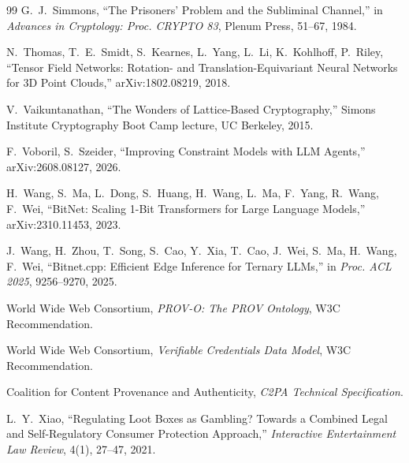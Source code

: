 \begin{thebibliography}{99}
G.~J.~Simmons, ``The Prisoners' Problem and the Subliminal Channel,'' in \textit{Advances in Cryptology: Proc. CRYPTO 83}, Plenum Press, 51--67, 1984.

N.~Thomas, T.~E.~Smidt, S.~Kearnes, L.~Yang, L.~Li, K.~Kohlhoff, P.~Riley, ``Tensor Field Networks: Rotation- and Translation-Equivariant Neural Networks for 3D Point Clouds,'' arXiv:1802.08219, 2018.

V.~Vaikuntanathan, ``The Wonders of Lattice-Based Cryptography,'' Simons Institute Cryptography Boot Camp lecture, UC Berkeley, 2015.

F.~Voboril, S.~Szeider, ``Improving Constraint Models with LLM Agents,'' arXiv:2608.08127, 2026.

H.~Wang, S.~Ma, L.~Dong, S.~Huang, H.~Wang, L.~Ma, F.~Yang, R.~Wang, F.~Wei, ``BitNet: Scaling 1-Bit Transformers for Large Language Models,'' arXiv:2310.11453, 2023.

J.~Wang, H.~Zhou, T.~Song, S.~Cao, Y.~Xia, T.~Cao, J.~Wei, S.~Ma, H.~Wang, F.~Wei, ``Bitnet.cpp: Efficient Edge Inference for Ternary LLMs,'' in \textit{Proc. ACL 2025}, 9256--9270, 2025.

World Wide Web Consortium, \textit{PROV-O: The PROV Ontology}, W3C Recommendation.

World Wide Web Consortium, \textit{Verifiable Credentials Data Model}, W3C Recommendation.

Coalition for Content Provenance and Authenticity, \textit{C2PA Technical Specification}.

L.~Y.~Xiao, ``Regulating Loot Boxes as Gambling? Towards a Combined Legal and Self-Regulatory Consumer Protection Approach,'' \textit{Interactive Entertainment Law Review}, 4(1), 27--47, 2021.

\end{thebibliography}
